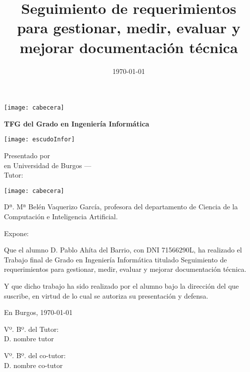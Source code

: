 \documentclass[a4paper,12pt,twoside]{memoir}
\title{Seguimiento de requerimientos para gestionar, medir, evaluar y mejorar documentación técnica}
\author{\nombre}
\date{\today}
\makeatletter
\def\maketitle{
  \null
  \thispagestyle{empty}
\noindent\texttt{[image: cabecera]}\vspace{1cm}%
  \vfill
  \colorbox{cpardoBox}{%
    \begin{minipage}{.8\textwidth}
      \vspace{.5cm}\Large
      \begin{center}
      \textbf{TFG del Grado en Ingeniería Informática}\vspace{.6cm}\\
      \textbf{\LARGE\@title{}}
      \end{center}
      \vspace{.2cm}
    \end{minipage}

  }%
  \hfill\begin{minipage}{.20\textwidth}
    \texttt{[image: escudoInfor]}
  \end{minipage}
  \vfill
  \begin{center}%
  {%
    \noindent\LARGE
    Presentado por \@author{}\\ 
    en Universidad de Burgos --- \@date{}\\
    Tutor: \@tutor{}\\
  }%
  \end{center}%
  \null
  \cleardoublepage
  }
\newcommand{\nombre}{Pablo Ahíta del Barrio} %
\newcommand{\dni}{71566290L}
\makeatother
\begin{document}
\maketitle


\newpage\null\thispagestyle{empty}\newpage


\thispagestyle{empty}


\noindent\texttt{[image: cabecera]}\vspace{1cm}

\noindent Dª. Mª Belén Vaquerizo García, profesora del departamento de Ciencia de la Computación e Inteligencia Artificial.

\noindent Expone:

\noindent Que el alumno D. \nombre, con DNI \dni, ha realizado el Trabajo final de Grado en Ingeniería Informática titulado Seguimiento de requerimientos para gestionar, medir, evaluar y mejorar documentación técnica.

\noindent Y que dicho trabajo ha sido realizado por el alumno bajo la dirección del que suscribe, en virtud de lo cual se autoriza su presentación y defensa.

\begin{center} %
En Burgos, {\large \today}
\end{center}

\vfill\vfill\vfill

\begin{minipage}{0.45\textwidth}
\begin{flushleft} %
Vº. Bº. del Tutor:\\[2cm]
D. nombre tutor
\end{flushleft}
\end{minipage}
\hfill
\begin{minipage}{0.45\textwidth}
\begin{flushleft} %
Vº. Bº. del co-tutor:\\[2cm]
D. nombre co-tutor
\end{flushleft}
\end{minipage}
\hfill

\vfill



\newpage\null\thispagestyle{empty}\newpage
\end{document}

